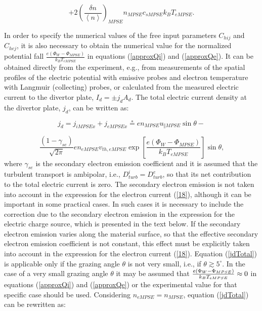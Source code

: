 \documentclass[11pt]{article}
\begin{document}
\begin{equation}
+2\left( \frac{\delta n}{\left\langle n\right\rangle }\right)
_{MPSE}n_{MPSE}c_{sMPSE}k_{B}T_{eMPSE}\text{.}   \label{approxQe}
\end{equation}

\bigskip

In order to specify the numerical values of the free input parameters $%
C_{hij}$ and $C_{hej}$, it is also necessary to obtain the numerical value
for the normalized potential fall $\frac{e\left( \Phi_{W}-\Phi_{MPSE}\right) 
}{k_{B}T_{eMPSE}}$ in equations (\ref{approxQi}) and (\ref{approxQe}). It
can be obtained directly from the experiment, e.g., from measurements of the
spatial profiles of the electric potential with emissive probes and electron
temperature with Langmuir (collecting) probes, or calculated from the
measured electric current to the divertor plate, $I_{d}=\pm j_{d}A_{d}$. The
total electric current density at the divertor plate, $j_{d}$, can be
written as:

\begin{equation*}
j_{d}=j_{iMPSEx}+j_{eMPSEx}\circeq en_{MPSE}u_{\Vert MPSE}\sin\theta- 
\end{equation*}

\begin{equation}
\frac{\left( 1-\gamma_{se}\right) }{\sqrt{2\pi}}en_{eMPSE}v_{th,eMPSE}\exp%
\left[ \frac{e\left( \Phi_{W}-\Phi_{MPSE}\right) }{k_{B}T_{eMPSE}}\right]
\sin\theta\text{,}   \label{jdTotal}
\end{equation}
where $\gamma_{se}$ is the secondary electron emission coefficient and it is
assumed that the turbulent transport is ambipolar, i.e., $%
D_{turb}^{i}=D_{turb}^{e}$, so that its net contribution to the total
electric current is zero. The secondary electron emission is not taken into
account in the expression for the electron current (\ref{18}), although it
can be important in some practical cases. In such cases it is necessary to
include the correction due to the secondary electron emission in the
expression for the electric charge source, which is presented in the text
below. If the secondary electron emission varies along the material surface,
so that the effective secondary electron emission coefficient is not
constant, this effect must be explicitly taken into account in the
expression for the electron current (\ref{18}). Equation (\ref{jdTotal}) is
applicable only if the grazing angle $\theta$ is not very small, i.e., if $%
\theta\gtrsim5^{\circ}$. In the case of a very small grazing angle $\theta$
it may be assumed that $\frac{e\left( \Phi_{W}-\Phi_{MPSE}\right) }{%
k_{B}T_{eMPSE}}\approx0$ in equations (\ref{approxQi}) and (\ref{approxQe})
or the experimental value for that specific case should be used. Considering 
$n_{eMPSE}=n_{MPSE}$, equation (\ref{jdTotal}) can be rewritten as:
\end{document}
